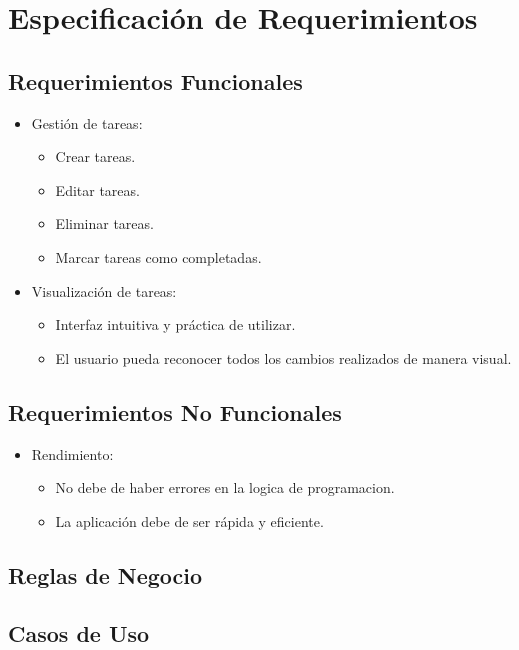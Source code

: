 \chapter{Especificación de Requerimientos}
\section{Requerimientos Funcionales}
\begin{itemize}
  \item Gestión de tareas:
    \begin{itemize}
      \item Crear tareas.
      \item Editar tareas.
      \item Eliminar tareas.
      \item Marcar tareas como completadas.
    \end{itemize}
  \item Visualización de tareas:
    \begin{itemize}
      \item Interfaz intuitiva y práctica de utilizar.
      \item El usuario pueda reconocer todos los cambios realizados de manera visual.
    \end{itemize}
\end{itemize}

\section{Requerimientos No Funcionales}
\begin{itemize}
  \item Rendimiento:
    \begin{itemize}
      \item No debe de haber errores en la logica de programacion.
      \item La aplicación debe de ser rápida y eficiente.
    \end{itemize}
\end{itemize}
\section{Reglas de Negocio}

\section{Casos de Uso}

